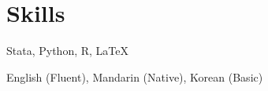 \documentclass[12pt,letterpaper]{report}
\begin{document}
    \section*{Skills}
    \begin{tablist}
        \item[Programming] \tab{}Stata, Python, R, \LaTeX
        \item[Languages] \tab{}English (Fluent), Mandarin (Native), Korean (Basic)
    \end{tablist}
\end{document}
